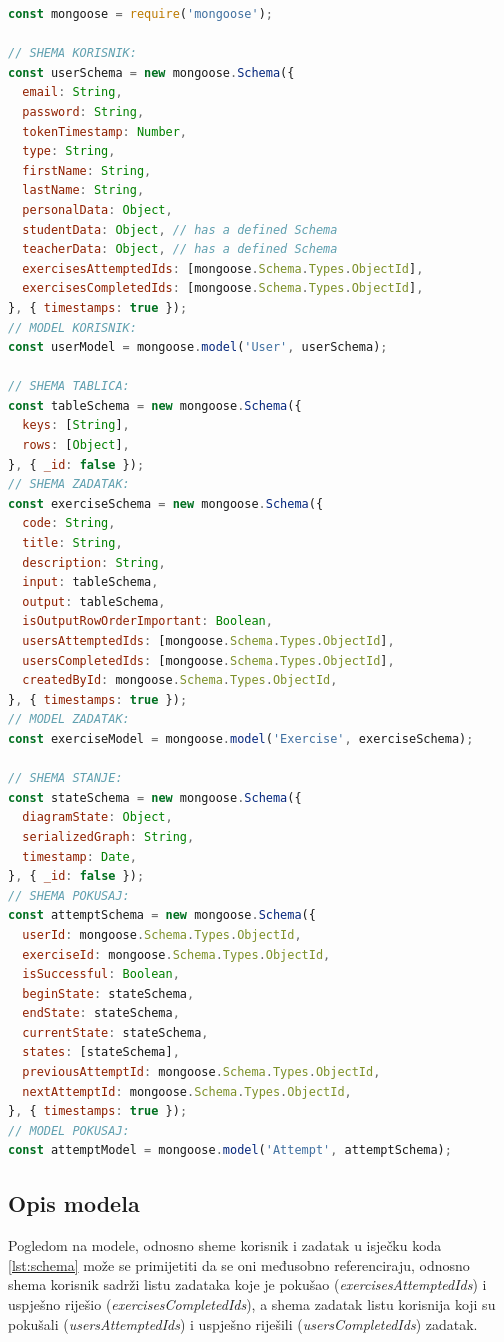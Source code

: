 \documentclass[times, utf8, diplomski, numeric]{fer}
\newcommand{\razmakp}{\vspace{18pt}}
\newcommand{\razmaks}{\vspace{10pt}}
\begin{document}
\razmakp %
\begin{lstlisting}[language=JavaScript, caption={Pojednostavljena verzija podatkovnih modela, odnosno Mongoose shema dokumenata spremljenih u Mongo bazi}, label={lst:schema}]
const mongoose = require('mongoose');

// SHEMA KORISNIK:
const userSchema = new mongoose.Schema({
  email: String,
  password: String,
  tokenTimestamp: Number,
  type: String,
  firstName: String,
  lastName: String,
  personalData: Object,
  studentData: Object, // has a defined Schema
  teacherData: Object, // has a defined Schema
  exercisesAttemptedIds: [mongoose.Schema.Types.ObjectId],
  exercisesCompletedIds: [mongoose.Schema.Types.ObjectId],
}, { timestamps: true });
// MODEL KORISNIK:
const userModel = mongoose.model('User', userSchema);

// SHEMA TABLICA:
const tableSchema = new mongoose.Schema({
  keys: [String],
  rows: [Object],
}, { _id: false });
// SHEMA ZADATAK:
const exerciseSchema = new mongoose.Schema({
  code: String,
  title: String,
  description: String,
  input: tableSchema,
  output: tableSchema,
  isOutputRowOrderImportant: Boolean,
  usersAttemptedIds: [mongoose.Schema.Types.ObjectId],
  usersCompletedIds: [mongoose.Schema.Types.ObjectId],
  createdById: mongoose.Schema.Types.ObjectId,
}, { timestamps: true });
// MODEL ZADATAK:
const exerciseModel = mongoose.model('Exercise', exerciseSchema);

// SHEMA STANJE:
const stateSchema = new mongoose.Schema({
  diagramState: Object,
  serializedGraph: String,
  timestamp: Date,
}, { _id: false });
// SHEMA POKUSAJ:
const attemptSchema = new mongoose.Schema({
  userId: mongoose.Schema.Types.ObjectId,
  exerciseId: mongoose.Schema.Types.ObjectId,
  isSuccessful: Boolean,
  beginState: stateSchema,
  endState: stateSchema,
  currentState: stateSchema,
  states: [stateSchema],
  previousAttemptId: mongoose.Schema.Types.ObjectId,
  nextAttemptId: mongoose.Schema.Types.ObjectId,
}, { timestamps: true });
// MODEL POKUSAJ:
const attemptModel = mongoose.model('Attempt', attemptSchema);
\end{lstlisting}
\razmaks

\subsection{Opis modela}

Pogledom na modele, odnosno sheme korisnik i zadatak u isječku koda \ref{lst:schema} može se primijetiti da se oni međusobno referenciraju, odnosno shema korisnik sadrži listu zadataka koje je pokušao (\emph{exercisesAttemptedIds}) i uspješno riješio (\emph{exercisesCompletedIds}), a shema zadatak listu korisnija koji su pokušali (\emph{usersAttemptedIds}) i uspješno riješili (\emph{usersCompletedIds}) zadatak.
\end{document}
